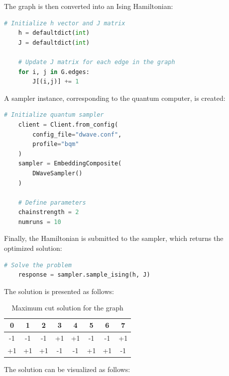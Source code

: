\documentclass{article}
\begin{document}
\begin{multicols}{2}
The graph is then converted into an Ising Hamiltonian:

\begin{lstlisting}[language=Python]
    # Initialize h vector and J matrix
    h = defaultdict(int)
    J = defaultdict(int)

    # Update J matrix for each edge in the graph
    for i, j in G.edges:
        J[(i,j)] += 1
\end{lstlisting}

A sampler instance, corresponding to the quantum computer, is created:

\begin{lstlisting}[language=Python]
    # Initialize quantum sampler
    client = Client.from_config(
        config_file="dwave.conf",
        profile="bqm"
    )
    sampler = EmbeddingComposite(
        DWaveSampler()
    )
    
    # Define parameters
    chainstrength = 2
    numruns = 10
\end{lstlisting}

Finally, the Hamiltonian is submitted to the sampler, which returns the optimized solution:

\begin{lstlisting}[language=Python]
    # Solve the problem
    response = sampler.sample_ising(h, J) 
\end{lstlisting}

The solution is presented as follows:

\begin{table}[H]
    \centering
    \begin{tabular}{cccccccc}
        \hline
        0 & 1 & 2 & 3 & 4 & 5 & 6 & 7 \\
        \hline
        -1 & -1 & -1 & +1 & +1 & -1 & -1 & +1 \\
        +1 & +1 & +1 & -1 & -1 & +1 & +1 & -1 \\
    \end{tabular}
    \caption{Maximum cut solution for the graph}
    \label{tab:Solution}
\end{table}

The solution can be visualized as follows:


\end{multicols}
\end{document}
